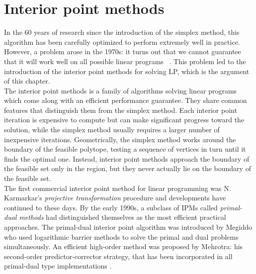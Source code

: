 \documentclass[a4paper,10 pt,titlepage,twoside]{book}
\theoremstyle{plain}
\theoremstyle{definition}
\theoremstyle{remark}
\begin{document}
\chapter{Interior point methods}
In the 60 years of research since the introduction of the simplex method, this algorithm has been carefully optimized to perform extremely well in practice. However, a problem arose in the 1970s: it turns out that we cannot guarantee that it will work well on all possible linear programs ~\cite{3}.
This problem led to the introduction of the interior point methods for solving LP, which is the argument of this chapter.\\The interior point methods is a family of algorithms solving linear programs which come along with an efficient performance guarantee. They share common features that distinguish them from the simplex method. Each interior point iteration is expensive to compute but can make significant progress toward the solution, while the simplex method usually requires a larger number of inexpensive iterations. Geometrically, the simplex method works around the boundary of the feasible polytope, testing a sequence of vertices in turn until it finds the optimal one. Instead, interior point methods approach the boundary of the feasible set only in the region, but they never actually lie on the boundary of the feasible set.\\
The first commercial interior point method for linear programming was N. Karmarkar's  \textit{projective transformation} procedure \cite{Kar} and developments have continued to these days. 
By the early 1990s, a subclass of IPMs called \textit{primal-dual methods} had distinguished themselves as the most efficient practical approaches. The primal-dual interior point algorithm was introduced by Megiddo \cite{meg}  who used logarithmic barrier methods to solve
the primal and dual problems simultaneously. An efficient
high-order method was proposed by Mehrotra: his second-order predictor-corrector
strategy, that has been incorporated in all primal-dual type implementations \cite{MER} .\\ 
\end{document}

